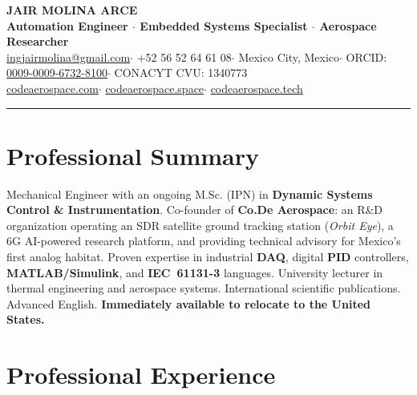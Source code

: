 \documentclass[10pt, letterpaper]{article}
\begin{document}
\pagestyle{empty}

\begin{center}
  {\LARGE\bfseries\color{azuloscuro} JAIR MOLINA ARCE}\\[3pt]
  {\small\color{azulmedio}\textbf{Automation Engineer $\cdot$ Embedded Systems Specialist $\cdot$ Aerospace Researcher}}\\[4pt]
  {\footnotesize\color{gristexto}
    \href{mailto:ingjairmolina@gmail.com}{ingjairmolina@gmail.com}\enspace$\cdot$\enspace
    +52 56 52 64 61 08\enspace$\cdot$\enspace
    Mexico City, Mexico\enspace$\cdot$\enspace
    ORCID: \href{https://orcid.org/0009-0009-6732-8100}{0009-0009-6732-8100}\enspace$\cdot$\enspace
    CONACYT CVU: 1340773
  }\\[1pt]
  {\footnotesize\color{azulmedio}
    \href{https://codeaerospace.com}{codeaerospace.com}\enspace$\cdot$\enspace
    \href{https://codeaerospace.space}{codeaerospace.space}\enspace$\cdot$\enspace
    \href{https://codeaerospace.tech}{codeaerospace.tech}
  }
\end{center}

\vspace{-2pt}
{\color{lineagris}\rule{\linewidth}{0.5pt}}
\vspace{2pt}

\section{Professional Summary}

{\small\color{gristexto}
Mechanical Engineer with an ongoing M.Sc. (IPN) in \textbf{Dynamic Systems Control \& Instrumentation}. Co-founder of \textbf{Co.De Aerospace}: an R\&D organization operating an SDR satellite ground tracking station (\textit{Orbit Eye}), a 6G AI-powered research platform, and providing technical advisory for Mexico's first analog habitat. Proven expertise in industrial \textbf{DAQ}, digital \textbf{PID} controllers, \textbf{MATLAB/Simulink}, and \textbf{IEC~61131-3} languages. University lecturer in thermal engineering and aerospace systems. International scientific publications. Advanced English. \textbf{Immediately available to relocate to the United States.}
}

\section{Professional Experience}
\end{document}
